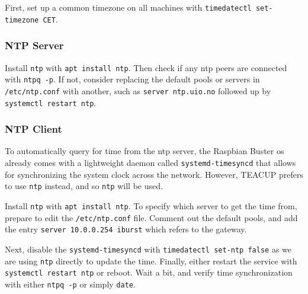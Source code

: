 First, set up a common timezone on all machines with \lstinline{timedatectl set-timezone CET}.

\subsubsection{NTP Server}

Install \lstinline{ntp} with \lstinline{apt install ntp}. Then check if any \gls{ntp} peers are connected with \lstinline{ntpq -p}. If not, consider replacing the default pools or servers in \lstinline{/etc/ntp.conf} with another, such as \lstinline{server ntp.uio.no} followed up by \lstinline{systemctl restart ntp}.

\subsubsection{NTP Client}

To automatically query for time from the \gls{ntp} server, the Raspbian Buster \gls{os} already comes with a lightweight daemon called \lstinline{systemd-timesyncd} that allows for synchronizing the system clock across the network. However, TEACUP prefers to use \lstinline{ntp} instead, and so \lstinline{ntp} will be used.

Install \lstinline{ntp} with \lstinline{apt install ntp}. To specify which server to get the time from, prepare to edit the \lstinline{/etc/ntp.conf} file. Comment out the default pools, and add the entry \lstinline{server 10.0.0.254 iburst} which refers to the gateway.

Next, disable the \lstinline{systemd-timesyncd} with \lstinline{timedatectl set-ntp false} as we are using \lstinline{ntp} directly to update the time. Finally, either restart the service with \lstinline{systemctl restart ntp} or reboot. Wait a bit, and verify time synchronization with either \lstinline{ntpq -p} or simply \lstinline{date}.
